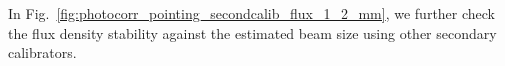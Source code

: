 In Fig.~\ref{fig:photocorr_pointing_secondcalib_flux_1_2_mm}, we further check the flux density stability against
the estimated beam size using other secondary calibrators.


